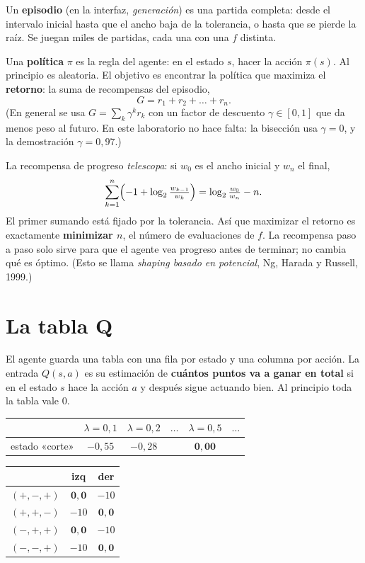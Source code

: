 Un \textbf{episodio} (en la interfaz, \emph{generación}) es una partida completa: desde el intervalo inicial hasta que el ancho baja de la tolerancia, o hasta que se pierde la raíz. Se juegan miles de partidas, cada una con una $f$ distinta.

Una \textbf{política} $\pi$ es la regla del agente: en el estado $s$, hacer la acción $\pi(s)$. Al principio es aleatoria. El objetivo es encontrar la política que maximiza el \textbf{retorno}: la suma de recompensas del episodio,
\[
G = r_1 + r_2 + \dots + r_n .
\]
(En general se usa $G = \sum_k \gamma^{k} r_k$ con un factor de descuento $\gamma\in[0,1]$ que da menos peso al futuro. En este laboratorio no hace falta: la bisección usa $\gamma = 0$, y la demostración $\gamma = 0{,}97$.)

\begin{nota}
La recompensa de progreso \emph{telescopa}: si $w_0$ es el ancho inicial y $w_n$ el final,
\[
\sum_{k=1}^{n}\Bigl(-1+\log_2\tfrac{w_{k-1}}{w_k}\Bigr) = \log_2\tfrac{w_0}{w_n} - n .
\]
El primer sumando está fijado por la tolerancia. Así que maximizar el retorno es exactamente \textbf{minimizar $n$}, el número de evaluaciones de $f$. La recompensa paso a paso solo sirve para que el agente vea progreso antes de terminar; no cambia qué es óptimo. (Esto se llama \emph{shaping basado en potencial}, Ng, Harada y Russell, 1999.)
\end{nota}

\section{La tabla Q}

El agente guarda una tabla con una fila por estado y una columna por acción. La entrada $Q(s,a)$ es su estimación de \textbf{cuántos puntos va a ganar en total} si en el estado $s$ hace la acción $a$ y después sigue actuando bien. Al principio toda la tabla vale 0.

\begin{center}
\begin{tabular}{l|ccccc}
 & $\lambda=0{,}1$ & $\lambda=0{,}2$ & $\dots$ & $\lambda=0{,}5$ & $\dots$ \\
\hline
estado «corte» & $-0{,}55$ & $-0{,}28$ & & $\mathbf{0{,}00}$ & \\
\end{tabular}
\qquad
\begin{tabular}{l|cc}
 & izq & der \\
\hline
$(+,-,+)$ & $\mathbf{0{,}0}$ & $-10$ \\
$(+,+,-)$ & $-10$ & $\mathbf{0{,}0}$ \\
$(-,+,+)$ & $\mathbf{0{,}0}$ & $-10$ \\
$(-,-,+)$ & $-10$ & $\mathbf{0{,}0}$ \\
\end{tabular}
\end{center}


